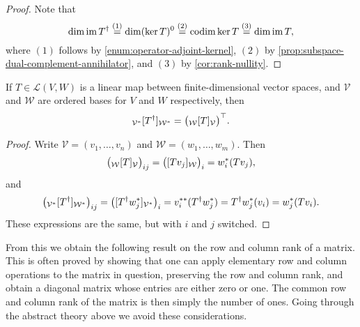 \documentclass[a4paper, 11pt]{memoir}
\numberwithin{equation}{chapter}
\newcommand{\calL}{\mathcal{L}}
\newcommand{\calV}{\mathcal{V}}
\newcommand{\calW}{\mathcal{W}}
\newcommand{\trans}{^{\top}}
\newcommand{\im}{\operatorname{im}}
\begin{document}
\begin{proof}
    Note that
    \begin{equation*}
        \dim \im T^\dagger
            \overset{(1)}{=} \dim (\ker T)^0
            \overset{(2)}{=} \codim \ker T
            \overset{(3)}{=} \dim \im T,
    \end{equation*}
    where $(1)$ follows by \cref{enum:operator-adjoint-kernel}, $(2)$ by \cref{prop:subspace-dual-complement-annihilator}, and $(3)$ by \cref{cor:rank-nullity}.
\end{proof}


\begin{proposition}
    \label{prop:adjoint-mr}
    If $T \in \calL(V,W)$ is a linear map between finite-dimensional vector spaces, and $\calV$ and $\calW$ are ordered bases for $V$ and $W$ respectively, then
    \begin{equation*}
        \mr{\calV^*}{T^\dagger}{\calW^*}
            = \bigl( \mr{\calW}{T}{\calV} \bigr)\trans.
    \end{equation*}
\end{proposition}

\begin{proof}
    Write $\calV = (v_1, \ldots, v_n)$ and $\calW = (w_1, \ldots, w_m)$. Then
    \begin{equation*}
        \bigl( \mr{\calW}{T}{\calV} \bigr)_{ij}
            = \bigl( \coordvec{Tv_j}{\calW} \bigr)_i
            = w_i^*(Tv_j),
    \end{equation*}
    and
    \begin{equation*}
        \bigl( \mr{\calV^*}{T^\dagger}{\calW^*} \bigr)_{ij}
            = \bigl( \coordvec{T^\dagger w_j^*}{\calV^*} \bigr)_i
            = v_i^{**}(T^\dagger w_j^*)
            = T^\dagger w_j^*(v_i)
            = w_j^*(Tv_i).
    \end{equation*}
    These expressions are the same, but with $i$ and $j$ switched.
\end{proof}

From this we obtain the following result on the row and column rank of a matrix. This is often proved by showing that one can apply elementary row and column operations to the matrix in question, preserving the row and column rank, and obtain a diagonal matrix whose entries are either zero or one. The common row and column rank of the matrix is then simply the number of ones. Going through the abstract theory above we avoid these considerations.
\end{document}
